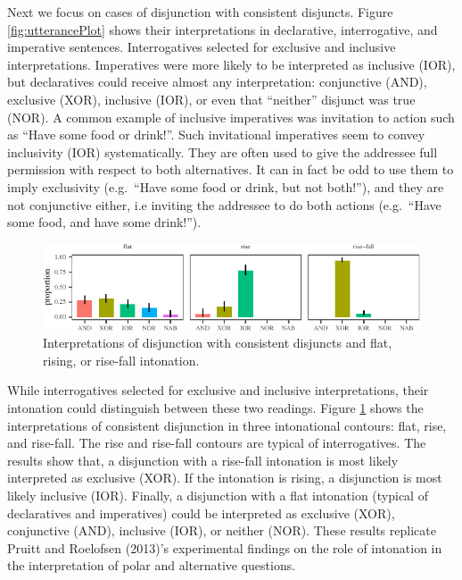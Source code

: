 \documentclass[,man,floatsintext]{apa6}
\begin{document}
Next we focus on cases of disjunction with consistent disjuncts. Figure \ref{fig:utterancePlot} shows their interpretations in declarative, interrogative, and imperative sentences. Interrogatives selected for exclusive and inclusive interpretations. Imperatives were more likely to be interpreted as inclusive (IOR), but declaratives could receive almost any interpretation: conjunctive (AND), exclusive (XOR), inclusive (IOR), or even that \enquote{neither} disjunct was true (NOR). A common example of inclusive imperatives was invitation to action such as \enquote{Have some food or drink!}. Such invitational imperatives seem to convey inclusivity (IOR) systematically. They are often used to give the addressee full permission with respect to both alternatives. It can in fact be odd to use them to imply exclusivity (e.g.~\enquote{Have some food or drink, but not both!}), and they are not conjunctive either, i.e inviting the addressee to do both actions (e.g.~\enquote{Have some food, and have some drink!}).

\begin{figure}[tb]

{\centering \includegraphics{figs/intonationPlot-1} 

}

\caption{Interpretations of disjunction with consistent disjuncts and flat, rising, or rise-fall intonation.}\label{fig:intonationPlot}
\end{figure}

While interrogatives selected for exclusive and inclusive interpretations, their intonation could distinguish between these two readings. Figure \ref{fig:intonationPlot} shows the interpretations of consistent disjunction in three intonational contours: flat, rise, and rise-fall. The rise and rise-fall contours are typical of interrogatives. The results show that, a disjunction with a rise-fall intonation is most likely interpreted as exclusive (XOR). If the intonation is rising, a disjunction is most likely inclusive (IOR). Finally, a disjunction with a flat intonation (typical of declaratives and imperatives) could be interpreted as exclusive (XOR), conjunctive (AND), inclusive (IOR), or neither (NOR). These results replicate Pruitt and Roelofsen (2013)'s experimental findings on the role of intonation in the interpretation of polar and alternative questions.
\end{document}
